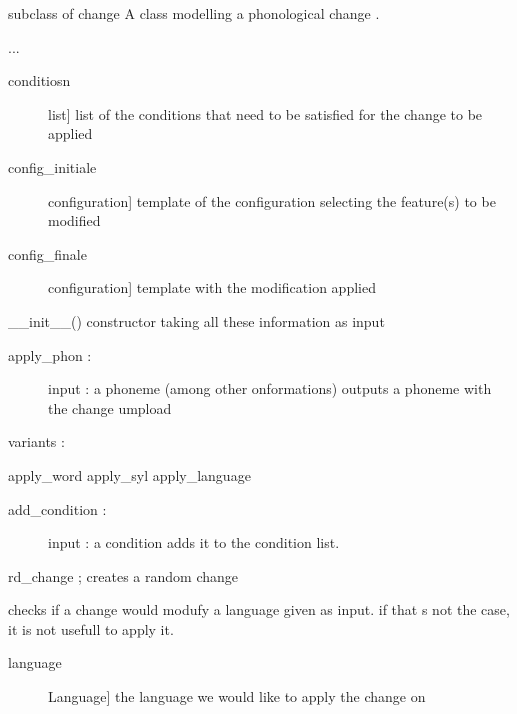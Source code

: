 \documentclass[letterpaper,10pt,english]{sphinxmanual}
\begin{document}
\begin{fulllineitems}
\label{\detokenize{index:Change.P_change}}
\sphinxAtStartPar
subclass of change 
A class modelling a phonological change .

\sphinxAtStartPar
...
\begin{description}
\item[{conditiosn}] \leavevmode{[}list{]}
\sphinxAtStartPar
list of the conditions that need to be satisfied for the change to be applied

\item[{config\_initiale}] \leavevmode{[}configuration{]}
\sphinxAtStartPar
template of the configuration selecting the feature(s) to be modified

\item[{config\_finale}] \leavevmode{[}configuration{]}
\sphinxAtStartPar
template with the modification applied

\end{description}

\sphinxAtStartPar
\_\_init\_\_() constructor taking all these information as input
\begin{description}
\item[{apply\_phon :}] \leavevmode
\sphinxAtStartPar
input : a phoneme (among other onformations)
outputs a phoneme with the change umpload

\end{description}

\sphinxAtStartPar
variants :

\sphinxAtStartPar
apply\_word
apply\_syl
apply\_language
\begin{description}
\item[{add\_condition :}] \leavevmode
\sphinxAtStartPar
input : a condition
adds it to the condition list.

\end{description}

\sphinxAtStartPar
rd\_change ; creates a random change

\begin{fulllineitems}
\label{\detokenize{index:Change.P_change.applicable}}
\sphinxAtStartPar
checks if a change would modufy a language given as input. 
if that s not the case, it is not usefull to apply it.
\begin{description}
\item[{language}] \leavevmode{[}Language{]}
\sphinxAtStartPar
the language we would like to apply the change on


\end{description}
\end{fulllineitems}
\end{fulllineitems}
\end{document}
